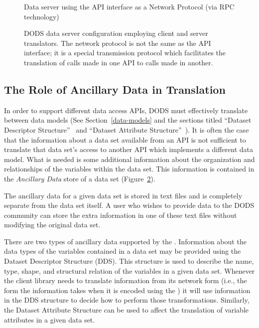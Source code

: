 \begin{figure}
\centerline{}
\caption{Data server using the API interface as a Network Protocol (via RPC
    technology)}
\label{fig:simple-server}
\end{figure}

\begin{figure}
\centerline{}
\caption{DODS data server configuration employing client and server
    translators. The network protocol is not the same as the API interface;
    it is a special transmission protocol which facilitates the translation
    of calls made in one API to calls made in another.}
\label{fig:dods-server}
\end{figure}

\subsection{The Role of Ancillary Data in Translation}

In order to support different data access APIs, DODS must effectively
translate between data models (See Section~\ref{data-models} and the \DTP
sections titled ``Dataset Descriptor Structure''~ and
``Dataset Attribute Structure''~). It is often the case
that the information about a data set available from an API is not sufficient
to translate that data set's access to another API which implements a
different data model. What is needed is some additional information about the
organization and relationships of the variables within the data set.  This
information is contained in the {\em Ancillary Data\/} store of a data set
(Figure~\ref{fig:dods-server}).

The ancillary data for a given data set is stored in text files and is
completely separate from the data set itself. A user who wishes to provide
data to the DODS community can store the extra information in one of these
text files without modifying the original data set. 

There are two types of ancillary data supported by the \dtp. Information
about the data types of the variables contained in a data set may be provided
using the Dataset Descriptor Structure (DDS). This structure is used to
describe the name, type, shape, and structural relation of the variables in a
given data set. Whenever the client library needs to translate information
from its network form (i.e., the form the information takes when it is
encoded using the \dtp) it will use information in the DDS structure to
decide how to perform those transformations. Similarly, the Dataset Attribute
Structure can be used to affect the translation of variable attributes in a
given data set.

